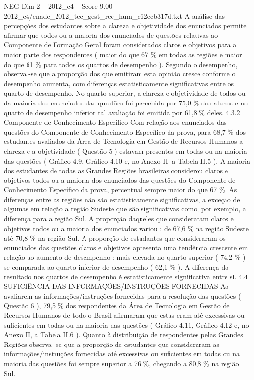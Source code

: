 \begin{textsample}{NEG Dim 2 – 2012\_c4 – Score 9.00 – 2012\_c4/enade\_2012\_tec\_gest\_rec\_hum\_c62ecb317d.txt}
A análise das percepções dos estudantes sobre a clareza e objetividade dos enunciados permite afirmar que todos ou a maioria dos enunciados de questões relativas ao Componente de Formação Geral foram considerados claros e objetivos para a maior parte dos respondentes ( maior do que 67 \% em todas as regiões e maior do que 61 \% para todos os quartos de desempenho ).
Segundo o desempenho, observa -se que a proporção dos que emitiram esta opinião cresce conforme o desempenho aumenta, com diferenças estatisticamente significativas entre os quarto de desempenho.
No quarto superior, a clareza e objetividade de todos ou da maioria dos enunciados das questões foi percebida por 75,0 \% dos alunos e no quarto de desempenho inferior tal avaliação foi emitida por 61,8 \% deles. 4.3.2 Componente de Conhecimento Específico Com relação aos enunciados das questões do Componente de Conhecimento Específico da prova, para 68,7 \% dos estudantes avaliados da Área de Tecnologia em Gestão de Recursos Humanos a clareza e a objetividade ( Questão 5 ) estavam presentes em todas ou na maioria das questões ( Gráfico 4.9, Gráfico 4.10 e, no Anexo II, a Tabela II.5 ).
A maioria dos estudantes de todas as Grandes Regiões brasileiras considerou claros e objetivos todos ou a maioria dos enunciados das questões do Componente de Conhecimento Específico da prova, percentual sempre maior do que 67 \%.
As diferenças entre as regiões não são estatisticamente significativas, a exceção de algumas em relação a região Sudeste que são significativas como, por exemplo, a diferença para a região Sul.
A proporção daqueles que consideraram claros e objetivos todos ou a maioria dos enunciados variou : de 67,6 \% na região Sudeste até 70,8 \% na região Sul.
A proporção de estudantes que consideraram os enunciados das questões claros e objetivos apresenta uma tendência crescente em relação ao aumento de desempenho : mais elevada no quarto superior ( 74,2 \% ) se comparada ao quarto inferior de desempenho ( 62,1 \% ).
A diferença do resultado nos quartos de desempenho é estatisticamente significativa entre si. 4.4 SUFICIÊNCIA DAS INFORMAÇÕES/INSTRUÇÕES FORNECIDAS Ao avaliarem as informações/instruções fornecidas para a resolução das questões ( Questão 6 ), 79,5 \% dos respondentes da Área de Tecnologia em Gestão de Recursos Humanos de todo o Brasil afirmaram que estas eram até excessivas ou suficientes em todas ou na maioria das questões ( Gráfico 4.11, Gráfico 4.12 e, no Anexo II, a Tabela II.6 ).
Quanto à distribuição de respondentes pelas Grandes Regiões observa -se que a proporção de estudantes que consideraram as informações/instruções fornecidas até excessivas ou suficientes em todas ou na maioria das questões foi sempre superior a 76 \%, chegando a 80,8 \% na região Sul.

\end{textsample}
